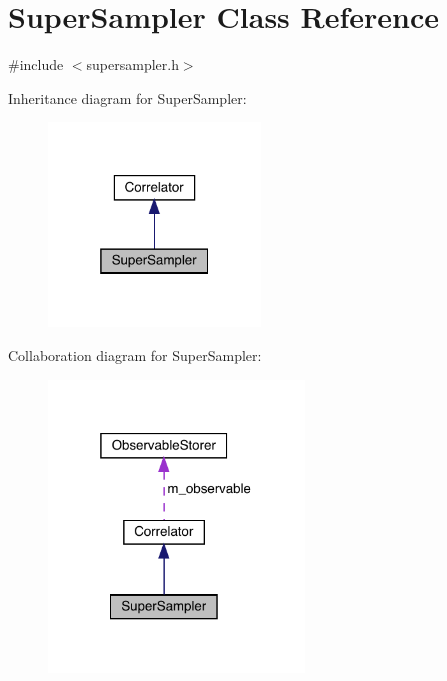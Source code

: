 \hypertarget{class_super_sampler}{}\section{Super\+Sampler Class Reference}
\label{class_super_sampler}


{\ttfamily \#include $<$supersampler.\+h$>$}



Inheritance diagram for Super\+Sampler\+:\nopagebreak
\begin{figure}[H]
\begin{center}
\leavevmode
\includegraphics[width=160pt]{class_super_sampler__inherit__graph}
\end{center}
\end{figure}


Collaboration diagram for Super\+Sampler\+:\nopagebreak
\begin{figure}[H]
\begin{center}
\leavevmode
\includegraphics[width=193pt]{class_super_sampler__coll__graph}
\end{center}
\end{figure}
